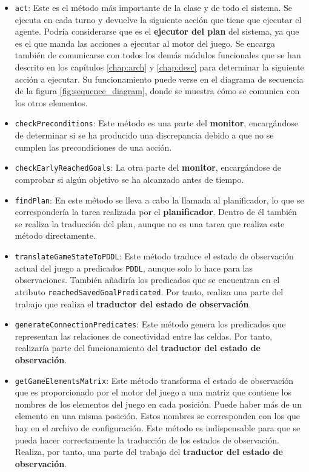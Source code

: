 \begin{itemize}[label=\textbullet]
    \item \texttt{act}: Este es el método más importante de la clase y de todo el sistema. Se ejecuta
    en cada turno y devuelve la siguiente acción que tiene que ejecutar el agente. Podría considerarse que
    es el \textbf{ejecutor del plan} del sistema, ya que es el que manda las acciones a ejecutar
    al motor del juego. Se encarga también de comunicarse con todos los demás módulos funcionales que se
    han descrito en los capítulos \ref{chap:arch} y \ref{chap:desc} para determinar la siguiente acción a
    ejecutar. Su funcionamiento puede verse en el diagrama de secuencia de la figura \ref{fig:sequence_diagram},
    donde se muestra cómo se comunica con los otros elementos.
    
    \item \texttt{checkPreconditions}: Este método es una parte del \textbf{monitor}, encargándose de
    determinar si se ha producido una discrepancia debido a que no se cumplen las precondiciones
    de una acción.
    
    \item \texttt{checkEarlyReachedGoals}: La otra parte del \textbf{monitor}, encargándose de
    comprobar si algún objetivo se ha alcanzado antes de tiempo.
    
    \item \texttt{findPlan}: En este método se lleva a cabo la llamada al planificador, lo que se
    correspondería la tarea realizada por el \textbf{planificador}. Dentro de él también se realiza
    la traducción del plan, aunque no es una tarea que realiza este método directamente.
    
    \item \texttt{translateGameStateToPDDL}: Este método traduce el estado de observación actual del juego
    a predicados \texttt{PDDL}, aunque solo lo hace para las observaciones. También añadiría los predicados
    que se encuentran en el atributo \texttt{reachedSavedGoalPredicated}. Por tanto, realiza una parte
    del trabajo que realiza el \textbf{traductor del estado de observación}.
    
    \item \texttt{generateConnectionPredicates}: Este método genera los predicados que representan
    las relaciones de conectividad entre las celdas. Por tanto, realizaría parte del funcionamiento
    del \textbf{traductor del estado de observación}.
    
    \item \texttt{getGameElementsMatrix}: Este método transforma el estado de observación que es
    proporcionado por el motor del juego a una matriz que contiene los nombres de los elementos del
    juego en cada posición. Puede haber más de un elemento en una misma posición. Estos nombres se
    corresponden con los que hay en el archivo de configuración. Este método es indispensable para
    que se pueda hacer correctamente la traducción de los estados de observación. Realiza, por tanto,
    una parte del trabajo del \textbf{traductor del estado de observación}.
    

\end{itemize}

